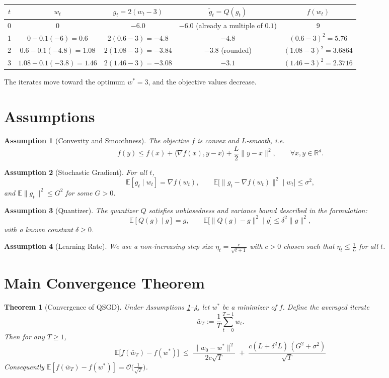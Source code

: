 \documentclass{article}
\newtheorem{theorem}{Theorem}
\newtheorem{assumption}{Assumption}
\newcommand{\E}{\mathbb{E}}
\newcommand{\R}{\mathbb{R}}
\begin{document}
\begin{center}
\begin{tabular}{c|c|c|c|c}
$t$ & $w_{t}$ & $g_{t}=2(w_{t}-3)$ & $\widetilde g_{t}=Q(g_{t})$ & $f(w_{t})$\\ \hline
0 & $0$ & $-6.0$ & $-6.0$ (already a multiple of $0.1$) & $9$\\
1 & $0-0.1(-6)=0.6$ & $2(0.6-3)=-4.8$ & $-4.8$ & $(0.6-3)^{2}=5.76$\\
2 & $0.6-0.1(-4.8)=1.08$ & $2(1.08-3)=-3.84$ & $-3.8$ (rounded) & $(1.08-3)^{2}=3.6864$\\
3 & $1.08-0.1(-3.8)=1.46$ & $2(1.46-3)=-3.08$ & $-3.1$ & $(1.46-3)^{2}=2.3716$
\end{tabular}
\end{center}
The iterates move toward the optimum $w^{*}=3$, and the objective values decrease.

\newpage
\section*{Assumptions}
\begin{assumption}[Convexity and Smoothness]\label{ass:convexsmooth}
The objective $f$ is convex and $L$‑smooth, i.e.
\[
f(y)\le f(x)+\langle\nabla f(x),y-x\rangle+\frac{L}{2}\|y-x\|^{2},
\qquad\forall x,y\in\R^{d}.
\]
\end{assumption}
\begin{assumption}[Stochastic Gradient]\label{ass:stoch}
For all $t$,
\[
\E[g_{t}\mid w_{t}]=\nabla f(w_{t}),\qquad 
\E\big[\|g_{t}-\nabla f(w_{t})\|^{2}\mid w_{t}\big]\le\sigma^{2},
\]
and $\E\|g_{t}\|^{2}\le G^{2}$ for some $G>0$.
\end{assumption}
\begin{assumption}[Quantizer]\label{ass:quant}
The quantizer $Q$ satisfies unbiasedness and variance bound described in the formulation:
\[
\E[Q(g)\mid g]=g,\qquad 
\E\!\big[\|Q(g)-g\|^{2}\mid g\big]\le\delta^{2}\|g\|^{2},
\]
with a known constant $\delta\ge0$.
\end{assumption}
\begin{assumption}[Learning Rate]\label{ass:lr}
We use a non‑increasing step size $\eta_{t}= \frac{c}{\sqrt{t+1}}$ with $c>0$ chosen such that $\eta_{t}\le \frac{1}{L}$ for all $t$.
\end{assumption}

\section*{Main Convergence Theorem}
\begin{theorem}[Convergence of QSGD]\label{thm:convergence}
Under Assumptions \ref{ass:convexsmooth}–\ref{ass:lr}, let $w^{*}$ be a minimizer of $f$. Define the averaged iterate 
\[
\bar w_{T}:=\frac{1}{T}\sum_{t=0}^{T-1} w_{t}.
\]
Then for any $T\ge1$,
\[
\boxed{\;
\E\big[f(\bar w_{T})-f(w^{*})\big]\;\le\;
\frac{\|w_{0}-w^{*}\|^{2}}{2c\sqrt{T}}
\;+\;
\frac{c(L+ \delta^{2}L)\,(G^{2}+\sigma^{2})}{\sqrt{T}}
\;}
\]
Consequently $\E[f(\bar w_{T})-f(w^{*})]=\mathcal{O}\!\big(\tfrac{1}{\sqrt{T}}\big)$.
\end{theorem}
\end{document}
